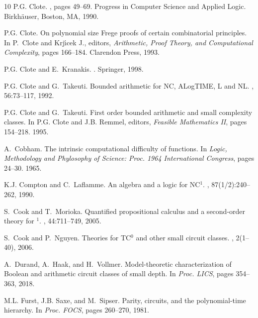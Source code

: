 \documentclass[11pt, oneside]{article}
\theoremstyle{definition}
\begin{document}
\begin{thebibliography}{10}
P.G. Clote.
, pages 49--69.
\newblock Progress in Computer Science and Applied Logic. Birkhäuser, Boston,
  MA, 1990.

P.G. Clote.
\newblock On polynomial size {F}rege proofs of certain combinatorial
  principles.
\newblock In P.~Clote and Krj{\'\i}cek J., editors, {\em Arithmetic, Proof
  Theory, and Computational Complexity}, pages 166--184. Clarendon Press, 1993.

P.G. Clote and E.~Kranakis.
.
\newblock Springer, 1998.

P.G. Clote and G.~Takeuti.
\newblock Bounded arithmetic for {NC}, {ALogTIME}, {L} and {NL}.
, 56:73--117, 1992.

P.G. Clote and G.~Takeuti.
\newblock First order bounded arithmetic and small complexity classes.
\newblock In P.G. Clote and J.B. Remmel, editors, {\em Feasible Mathematics
  {II}}, pages 154--218. 1995.

A.~Cobham.
\newblock The intrinsic computational difficulty of functions.
\newblock In {\em Logic, Methodology and Phylosophy of Science: Proc. 1964
  International Congress}, pages 24--30. 1965.

K.J. Compton and C.~Laflamme.
\newblock An algebra and a logic for {NC\({^1}\)}.
, 87(1/2):240--262, 1990.

S.~Cook and T.~Morioka.
\newblock Quantified propositional calculus and a second-order theory for
  $^1$.
, 44:711--749, 2005.

S.~Cook and P.~Nguyen.
\newblock Theories for {TC}$^0$ and other small circuit classes.
, 2(1--40), 2006.

A.~Durand, A.~Haak, and H.~Vollmer.
\newblock Model-theoretic characterization of {B}oolean and arithmetic circuit
  classes of small depth.
\newblock In {\em Proc. LICS}, pages 354--363, 2018.

M.L. Furst, J.B. Saxe, and M.~Sipser.
\newblock Parity, circuits, and the polynomial-time hierarchy.
\newblock In {\em Proc. FOCS}, pages 260--270, 1981.


\end{thebibliography}
\end{document}
